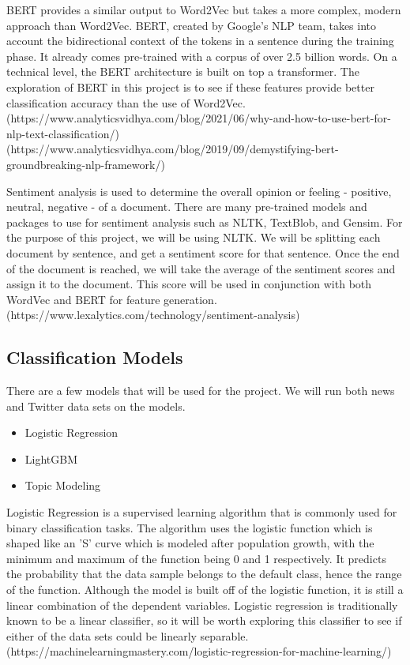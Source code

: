 \documentclass[conference]{IEEEtran}
\begin{document}
BERT provides a similar output to Word2Vec but takes a more complex, modern approach than Word2Vec. BERT, created by Google's NLP team, takes into account the bidirectional context of the tokens in a sentence during the training phase. It already comes pre-trained with a corpus of over 2.5 billion words. On a technical level, the BERT architecture is built on top a transformer. The exploration of BERT in this project is to see if these features provide better classification accuracy than the use of Word2Vec. (https://www.analyticsvidhya.com/blog/2021/06/why-and-how-to-use-bert-for-nlp-text-classification/)
(https://www.analyticsvidhya.com/blog/2019/09/demystifying-bert-groundbreaking-nlp-framework/)

Sentiment analysis is used to determine the overall opinion or feeling - positive, neutral, negative - of a document. There are many pre-trained models and packages to use for sentiment analysis such as NLTK, TextBlob, and Gensim. For the purpose of this project, we will be using NLTK. We will be splitting each document by sentence, and get a sentiment score for that sentence. Once the end of the document is reached, we will take the average of the sentiment scores and assign it to the document. This score will be used in conjunction with both WordVec and BERT for feature generation. (https://www.lexalytics.com/technology/sentiment-analysis)

\subsection{Classification Models}
There are a few models that will be used for the project. We will run both news and Twitter data sets on the models.
\begin{itemize}
    \item Logistic Regression
    \item LightGBM
    \item Topic Modeling
\end{itemize}

Logistic Regression is a supervised learning algorithm that is commonly used for binary classification tasks. The algorithm uses the logistic function which is shaped like an 'S' curve which is modeled after population growth, with the minimum and maximum of the function being 0 and 1 respectively. It predicts the probability that the data sample belongs to the default class, hence the range of the function. Although the model is built off of the logistic function, it is still a linear combination of the dependent variables. Logistic regression is traditionally known to be a linear classifier, so it will be worth exploring this classifier to see if either of the data sets could be linearly separable. (https://machinelearningmastery.com/logistic-regression-for-machine-learning/)
\end{document}
